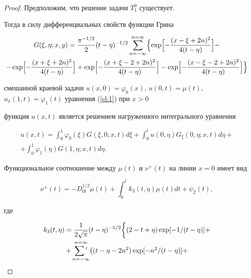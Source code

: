 \begin{proof}

Предположим, что решение задачи $T_1^0$ существует.

Тогда в силу дифференциальных свойств функции Грина \cite{eleevbalk:bib:Eleev}

\begin{multline*}

G(\xi,\eta;x,y)=\frac{\pi^{-1/2}}{2}(t-\eta)^{-1/2}\sum\limits_{n=-\infty}^{n=\infty}\Bigl\{\exp\Bigl[-\frac{(x-\xi+2n)^2}{4(t-\eta)}\Bigr]-\\

-\exp\Bigl[-\frac{(x+\xi+2n)^2}{4(t-\eta)}\Bigr]+\exp\Bigl[-\frac{(x+\xi-2+2n)^2}{4(t-\eta)}\Bigr]-\exp\Bigl[-\frac{(x-\xi-2+2n)^2}{4(t-\eta)}\Bigr]\Bigr\}

\end{multline*}

смешанной краевой задачи $u(x, 0)=\varphi_0(x)$, $u(0,t)=\mu(t)$, $u_x(1,t)=\varphi_1(t)$ уравнения (\ref{el:1}) при $x>0$

функция $u(x,t)$ является решением нагруженного интегрального уравнения

\begin{multline}\label{el:21}

u(x,t)=\int_0^1\varphi_0(\xi)G(\xi,0;x,t)d\xi+\int_0^tu(0,\eta)G_\xi(0,\eta;x,t)d\eta+\\

+\int_0^1\varphi_1(\eta)G(1,\eta;x,t)d\eta.

\end{multline}

Функциональное соотношение между $\mu(t)$ и $\nu^+(t)$ на линии $x=0$ имеет вид

\begin{equation} \label{el:22}

\nu^+(t)=-D_{0t}^{1/2}\mu(t)+\int_0^tk_3(t,\eta)\mu(t)dt+\psi_2(t),

\end{equation}

где

\begin{multline}\label{el:23}

k_3(t,\eta)=\frac{1}{2\sqrt{\pi}}(t-\eta)^{-5/2}\biggl\{(2-t+\eta)\exp[-1/(t-\eta)]+\\

+\mathop{\sum\rule{0mm}{11pt}{'}}\limits_{n=-\infty}^{n=\infty}\bigl((t-\eta-2n^2)\exp[-n^2/(t-\eta)]+\\


\end{multline}
\end{proof}
